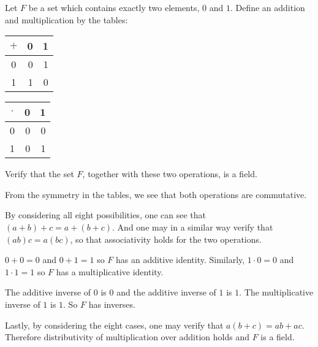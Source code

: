  Let $F$ be a set which contains exactly two elements, $0$
and $1$. Define an addition and multiplication by the tables:
\begin{center}
  \begin{tabular}{c|rr}
    $+$ & 0 & 1 \\
    \hline
    0 & 0 & 1 \\
    1 & 1 & 0
  \end{tabular}
  \qquad\qquad
  \begin{tabular}{c|rr}
    $\cdot$ & 0 & 1 \\
    \hline
    0 & 0 & 0 \\
    1 & 0 & 1
  \end{tabular}
\end{center}
Verify that the set $F$, together with these two operations, is a
field.
\begin{solution}
  From the symmetry in the tables, we see that both operations are
  commutative.

  By considering all eight possibilities, one can see that
  $(a + b) + c = a + (b + c)$. And one may in a similar way verify
  that $(ab)c = a(bc)$, so that associativity holds for the two
  operations.

  $0 + 0 = 0$ and $0 + 1 = 1$ so $F$ has an additive
  identity. Similarly, $1\cdot0 = 0$ and $1\cdot1 = 1$ so $F$ has a
  multiplicative identity.

  The additive inverse of $0$ is $0$ and the additive inverse of $1$
  is $1$. The multiplicative inverse of $1$ is $1$. So $F$ has
  inverses.

  Lastly, by considering the eight cases, one may verify that
  $a(b + c) = ab + ac$. Therefore distributivity of multiplication
  over addition holds and $F$ is a field.
\end{solution}
